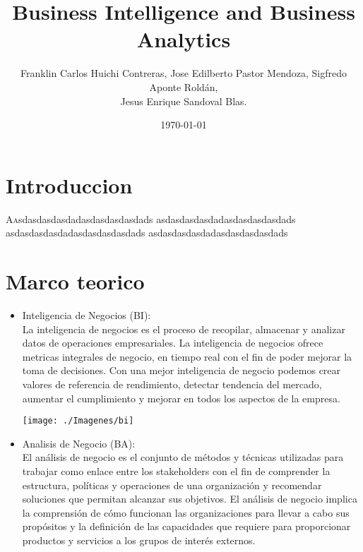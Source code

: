 \documentclass[twoside,twocolumn]{article}
\title{Business Intelligence and Business Analytics}
\author{Franklin Carlos Huichi Contreras, Jose Edilberto Pastor Mendoza, Sigfredo Aponte Roldán, \\
 Jesus Enrique Sandoval Blas. }
\date{\today}
\begin{document}
\maketitle


\section{Introduccion}
\lettrine[nindent=0em,lines=3]{A} asdasdasdasdadasdasdasdasdads asdasdasdasdadasdasdasdasdads asdasdasdasdadasdasdasdasdads asdasdasdasdadasdasdasdasdads



\section{Marco teorico}

\begin{itemize}
\item Inteligencia de Negocios (BI): \\ 
La inteligencia de negocios es el proceso de recopilar, almacenar y analizar datos de operaciones empresariales. La inteligencia de negocios ofrece metricas integrales de negocio,
en tiempo real con el fin de poder mejorar la toma de decisiones. Con una mejor inteligencia de negocio podemos crear valores de referencia de rendimiento, detectar tendencia del mercado,
aumentar el cumplimiento y mejorar en todos los aspectos de la empresa.
\begin{center}
	\texttt{[image: ./Imagenes/bi]} 
\end{center}

\item Analisis de Negocio (BA): \\ 
El análisis de negocio es el conjunto de métodos y técnicas utilizadas para trabajar como enlace entre los stakeholders con el fin de comprender la estructura, políticas y operaciones de una organización y recomendar soluciones que permitan alcanzar sus objetivos. El análisis de negocio implica la comprensión de cómo funcionan las organizaciones para llevar a cabo sus propósitos y la definición de las capacidades que requiere para proporcionar productos y servicios a los grupos de interés externos.

\end{itemize}
\end{document}
